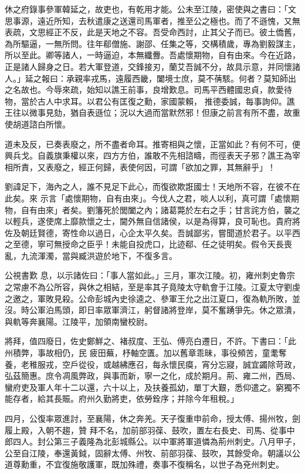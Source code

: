 \begin{pinyinscope}
 休之府錄事參軍韓延之，故吏也，有乾用才能。公未至江陵，密使與之書曰：「文思事源，遠近所知，去秋遣康之送還司馬軍者，推至公之極也。而了不遜愧，又無表疏，文思經正不反，此是天地之不容。吾受命西討，止其父子而已。彼土僑舊，
 為所驅逼，一無所問。往年郗僧施、謝邵、任集之等，交構積歲，專為劉毅謀主，所以至此。卿等諸人，一時逼迫，本無纖釁。吾處懷期物，自有由來。今在近路，正是諸人歸身之日。若大軍登道，交鋒接刃，蘭艾吾誠不分，故具示意，并同懷諸人。」延之報曰：承親率戎馬，遠履西畿，闔境士庶，莫不蒨駭。何者？莫知師出之名故也。今辱來疏，始知以譙王前事，良增歎息。司馬平西體國忠貞，款愛待物，當於古人中求耳。以君公有匡復之勳，家國蒙賴，
 推德委誠，每事詢仰。譙王往以微事見劾，猶自表遜位；況以大過而當默然邪！但康之前言有所不盡，故重使胡道諮白所懷。



 道未及反，已奏表廢之，所不盡者命耳。推寄相與之懷，正當如此？有何不可，便興兵戈。自義旗秉權以來，四方方伯，誰敢不先相諮疇，而徑表天子邪？譙王為宰相所責，又表廢之，經正何歸，表使何因，可謂「欲加之罪，其無辭乎」！



 劉諱足下，海內之人，誰不見足下此心，而復欲欺誑國士！天地所不容，在彼不在此矣。來
 示言「處懷期物，自有由來」。今伐人之君，啖人以利，真可謂「處懷期物，自有由來」者矣。劉籓死於閭闔之內；諸葛斃於左右之手；甘言詫方伯，襲之以輕兵，遂使席上靡款懷之士，閫外無自信諸侯，以是為得算，良可恥也。貴府將佐及朝廷賢德，寄性命以過日，心企太平久矣。吾誠鄙劣，嘗聞道於君子。以平西之至德，寧可無授命之臣乎！未能自投虎口，比迹郗、任之徒明矣。假令天長喪亂，九流渾濁，當與臧洪遊於地下，不復多言。



 公視書歎
 息，以示諸佐曰：「事人當如此。」三月，軍次江陵。初，雍州刺史魯宗之常慮不為公所容，與休之相結，至是率其子竟陵太守軌會于江陵。江夏太守劉虔之邀之，軍敗見殺。公命彭城內史徐逵之、參軍王允之出江夏口，復為軌所敗，並沒。時公軍泊馬頭，即日率眾軍濟江，躬督諸將登岸，莫不奮踴爭先。休之眾潰，與軌等奔襄陽。江陵平，加領南蠻校尉。



 將拜，值四廢日，佐史鄭鮮之、褚叔度、王弘、傅亮白遷日，不許。下書曰：「此州積弊，事故相仍，民
 疲田蕪，杼軸空匱。加以舊章乖昧，事役頻苦，童耄奪養，老稚服戎，空戶從役，或越紼應召，每永懷民瘼，宵分忘寢，誠宜蠲除苛政，弘茲簡惠。庶令凋風弊政，與事而新，寧一之化，成於期月。荊、雍二州，西局、蠻府吏及軍人年十二以還，六十以上，及扶養孤幼，單丁大艱，悉仰遣之。窮獨不能存者，給其長賑。府州久勤將吏，依勞銓序；并除今年租稅。」



 四月，公復率眾進討，至襄陽，休之奔羌。天子復重申前命，授太傅、揚州牧，劍履上殿，入朝不趨，贊
 拜不名，加前部羽葆、鼓吹，置左右長史、司馬、從事中郎四人。封公第三子義隆為北彭城縣公。以中軍將軍道憐為荊州刺史。八月甲子，公至自江陵，奉還黃鉞，固辭太傅、州牧、前部羽葆、鼓吹，其餘受命。朝議以公道尊勳重，不宜復施敬護軍，既加殊禮，奏事不復稱名，以世子為兗州刺史。




\end{pinyinscope}
